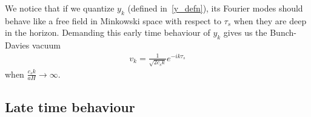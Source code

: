     We notice that if we quantize $y_k$
    (defined in~\eqref{y_defn}), its Fourier modes
    should behave like a free field in Minkowski space with respect to $\tau_s$
    when they are deep in the horizon.
    Demanding this early time behaviour of $y_k$
    gives us the Bunch-Davies vacuum
    \begin{align}\label{bd_ic}
        v_k = \frac{1}{\sqrt{2{c_s}k}}e^{-ik\tau_s}
    \end{align}
    when $\frac{{c_s}k}{aH}\rightarrow \infty$.


    \subsection{Late time behaviour}





